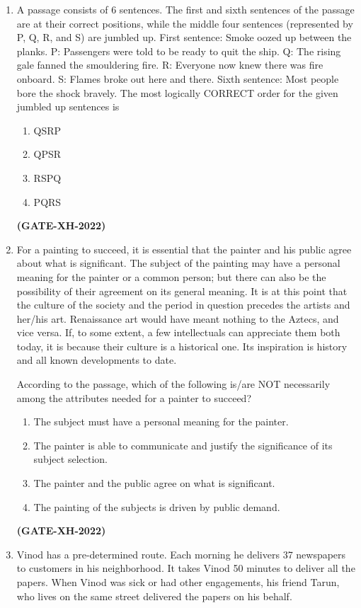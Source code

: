 \documentclass[journal]{IEEEtran}
\begin{document}
\begin{enumerate}
\item A passage consists of 6 sentences. The first and sixth sentences of the passage are at their correct positions, while the middle four sentences (represented by P, Q, R, and S) are jumbled up. First sentence: Smoke oozed up between the planks. P: Passengers were told to be ready to quit the ship. Q: The rising gale fanned the smouldering fire. R: Everyone now knew there was fire onboard. S: Flames broke out here and there. Sixth sentence: Most people bore the shock bravely. The most logically CORRECT order for the given jumbled up sentences is
\begin{enumerate}
\item QSRP
\item QPSR
\item RSPQ
\item PQRS
\end{enumerate}
\hfill\textbf{(GATE-XH-2022)}
\item For a painting to succeed, it is essential that the painter and his public agree about what is significant. The subject of the painting may have a personal meaning for the painter or a common person; but there can also be the possibility of their agreement on its general meaning. It is at this point that the culture of the society and the period in question precedes the artists and her/his art. Renaissance art would have meant nothing to the Aztecs, and vice versa. If, to some extent, a few intellectuals can appreciate them both today, it is because their culture is a historical one. Its inspiration is history and all known developments to date.

According to the passage, which of the following is/are NOT necessarily among the attributes needed for a painter to succeed?

\begin{enumerate}
\item The subject must have a personal meaning for the painter.
\item The painter is able to communicate and justify the significance of its subject selection.
\item The painter and the public agree on what is significant.
\item The painting of the subjects is driven by public demand.
\end{enumerate}
\hfill\textbf{(GATE-XH-2022)}
\item Vinod has a pre-determined route. Each morning he delivers 37 newspapers to customers in his neighborhood. It takes Vinod 50 minutes to deliver all the papers. When Vinod was sick or had other engagements, his friend Tarun, who lives on the same street delivered the papers on his behalf.


\end{enumerate}
\end{document}
